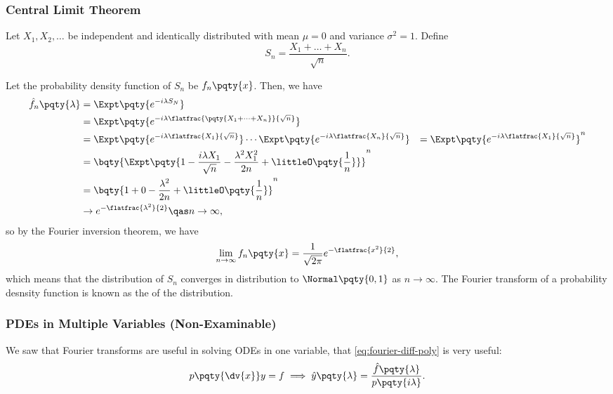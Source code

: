 \subsubsection{Central Limit Theorem}

Let \(X_1, X_2, \ldots\) be independent and identically distributed with mean \(\mu = 0\) and variance \(\sigma^2 = 1\). Define
\[
    S_n = \frac{X_1 + \dots + X_n}{\sqrt{n}}.
\]

Let the probability density function of \(S_n\) be \(f_n\pqty{x}\). Then, we have
\begin{subequations}
    \begin{align}
        \hat{f}_n\pqty{\lambda} &= \Expt\pqty{e^{- i \lambda S_N}} \\
        &= \Expt\pqty{e^{- i \lambda \flatfrac{\pqty{X_1 + \cdots + X_n}}{\sqrt{n}}}} \\
        &= \Expt\pqty{e^{- i \lambda \flatfrac{X_1}{\sqrt{n}}}} \cdots \Expt\pqty{e^{- i \lambda \flatfrac{X_n}{\sqrt{n}}}}
        &= \Expt\pqty{e^{- i \lambda \flatfrac{X_1}{\sqrt{n}}}}^n \\
        &= \bqty{\Expt\pqty{1 - \frac{i \lambda X_1}{\sqrt{n}} - \frac{\lambda^2 X_1^2}{2n} + \littleO\pqty{\frac{1}{n}}}}^n \\
        &= \bqty{1 + 0 - \frac{\lambda^2}{2n} + \littleO\pqty{\frac{1}{n}}}^n \\
        &\to e^{- \flatfrac{\lambda^2}{2}} \qas n \to \infty,
    \end{align}
\end{subequations}
so by the Fourier inversion theorem, we have
\begin{equation}
    \lim_{n \to \infty} f_n\pqty{x} = \frac{1}{\sqrt{2 \pi}} e^{- \flatfrac{x^2}{2}},
\end{equation}
which means that the distribution of \(S_n\) converges in distribution to \(\Normal\pqty{0, 1}\) as \(n \to \infty\). The Fourier transform of a probability desnsity function is known as the  of the distribution.

\subsubsection{PDEs in Multiple Variables (Non-Examinable)}

\smallskip

We saw that Fourier transforms are useful in solving ODEs in one variable, that \eqref{eq:fourier-diff-poly} is very useful:
\begin{equation}
    p\pqty{\dv{x}} y = f \implies \hat{y} \pqty{\lambda} = \frac{\hat{f}\pqty{\lambda}}{p\pqty{i \lambda}}.
\end{equation}

